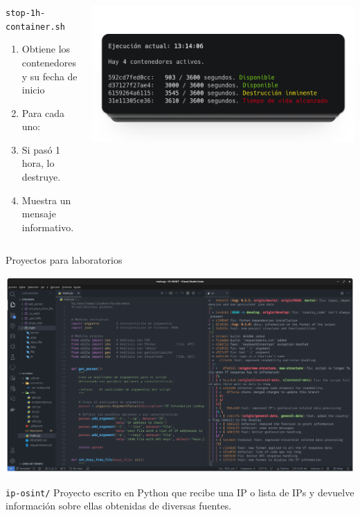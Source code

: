     \begin{frame}
        \begin{columns}[c]
                \begin{block}{\texttt{stop-1h-container.sh}}
                    \scriptsize

            \begin{enumerate}
                \item {Obtiene los contenedores\\y su fecha de inicio}
                \item Para cada uno:
                \item Si pasó 1 hora, lo destruye.
                \item Muestra un mensaje informativo.
            \end{enumerate}
                \end{block}
            
                \includegraphics[scale=0.2]{images/capturas/cron.png}
        \end{columns}
    \end{frame}

    \begin{frame}{Proyectos para laboratorios}
        \begin{center}
            \includegraphics[scale=0.1]{images/capturas/vscode/ip-osint.png}
        \end{center}

        \begin{block}{\texttt{ip-osint/}}
            Proyecto escrito en Python que recibe una IP o lista de IPs y devuelve información sobre ellas obtenidas de diversas fuentes.
        \end{block}
    \end{frame}

